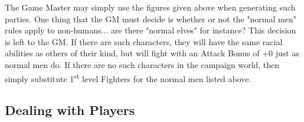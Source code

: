 \documentclass[a4paper,twoside,openany,10pt]{book}
\begin{document}
\begin{multicols}{2}
The Game Master may simply use the figures given above when generating such parties. One thing that the GM must decide is whether or not the "normal men" rules apply to non-humans... are there "normal elves" for instance? This decision is left to the GM. If there are such characters, they will have the same racial abilities as others of their kind, but will fight with an Attack Bonus of +0 just as normal men do. If there are no such characters in the campaign world, then simply substitute 1\textsuperscript{st} level Fighters for the normal men listed above.

\end{multicols}

\subsection{Dealing with Players}\label{dealing-with-players}
\end{document}
